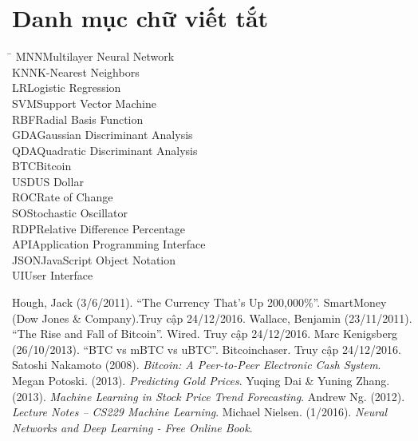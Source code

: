 \documentclass[12pt,a4paper]{report}
\begin{document}
 



\tableofcontents
\pagebreak
\listoffigures
\pagebreak 
\listoftables  
\pagebreak

\chapter*{Danh mục chữ viết tắt}
\thispagestyle{plain} 
\begin{tabbing}
\hspace{3cm}\= \kill
MNN\>Multilayer Neural Network\\
KNN\>K-Nearest Neighbors\\
LR\>Logistic Regression\\
SVM\>Support Vector Machine\\
RBF\>Radial Basis Function\\
GDA\>Gaussian Discriminant Analysis\\
QDA\>Quadratic Discriminant Analysis\\
BTC\>Bitcoin\\
USD\>US Dollar\\
ROC\>Rate of Change\\
SO\>Stochastic Oscillator\\
RDP\>Relative Difference Percentage\\
API\>Application Programming Interface\\
JSON\>JavaScript Object Notation\\
UI\>User Interface\\

\end{tabbing}

\pagebreak 


 



 
\pagebreak
\begin{thebibliography}{9}

Hough, Jack (3/6/2011). ``The Currency That's Up 200,000\%''. SmartMoney (Dow Jones \& Company).Truy cập 24/12/2016.
Wallace, Benjamin (23/11/2011). ``The Rise and Fall of Bitcoin''. Wired. Truy cập 24/12/2016.
Marc Kenigsberg (26/10/2013). ``BTC vs mBTC vs uBTC''. Bitcoinchaser. Truy cập 24/12/2016.
Satoshi Nakamoto (2008). \emph{Bitcoin: A Peer-to-Peer Electronic Cash System}.
Megan Potoski. (2013). \emph{Predicting Gold Prices}. 
Yuqing Dai \& Yuning Zhang. (2013). \emph{Machine Learning in Stock Price Trend Forecasting}.
Andrew Ng. (2012). \emph{Lecture Notes – CS229 Machine Learning}.
Michael Nielsen. (1/2016). \emph{Neural Networks and Deep Learning - Free Online Book}.
\end{thebibliography}
\end{document}
